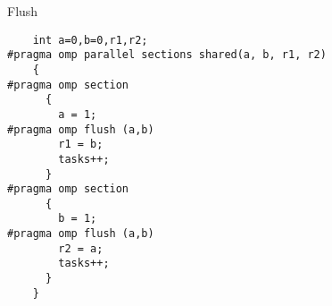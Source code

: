 \begin{numberedframe}{Flush}
\begin{lstlisting}
    int a=0,b=0,r1,r2;
#pragma omp parallel sections shared(a, b, r1, r2)
    {
#pragma omp section
      {
        a = 1;
#pragma omp flush (a,b)
        r1 = b;
        tasks++;
      }
#pragma omp section
      {
        b = 1;
#pragma omp flush (a,b)
        r2 = a;
        tasks++;
      }
    }
\end{lstlisting}
\end{numberedframe}

\endinput

\begin{numberedframe}{}
\begin{lstlisting}
\end{lstlisting}
  \begin{itemize}
  \item 
  \end{itemize}
\end{numberedframe}

\begin{numberedframe}{}
\begin{lstlisting}
\end{lstlisting}
  \begin{itemize}
  \item 
  \end{itemize}
\end{numberedframe}

